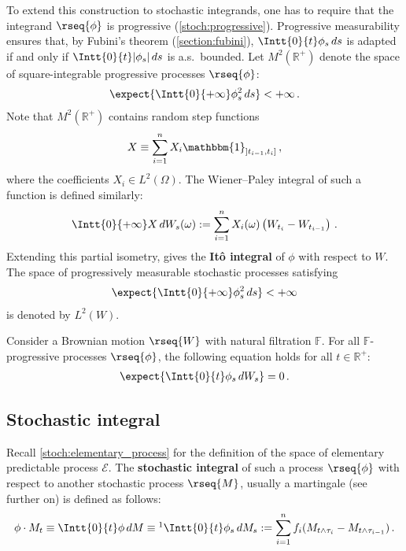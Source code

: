     To extend this construction to stochastic integrands, one has to require that the integrand $\rseq{\phi}$ is progressive (\cref{stoch:progressive}). Progressive measurability ensures that, by Fubini's theorem (\cref{section:fubini}), $\Intt{0}{t}\phi_s\,ds$ is adapted if and only if $\Intt{0}{t}|\phi_s|\,ds$ is a.s.~bounded. Let $M^2(\mathbb{R}^+)$ denote the space of square-integrable progressive processes $\rseq{\phi}$:
    \begin{gather}
        \expect{\Intt{0}{+\infty}\phi^2_s\,ds}<+\infty\,.
    \end{gather}
    Note that $M^2(\mathbb{R}^+)$ contains random step functions
    \begin{gather}
        X\equiv\sum_{i=1}^nX_i\mathbbm{1}_{]t_{i-1},t_i]}\,,
    \end{gather}
    where the coefficients $X_i\in L^2(\Omega)$. The Wiener--Paley integral of such a function is defined similarly:
    \begin{gather}
        \label{stoch:random_elementary_wiener_integral}
        \Intt{0}{+\infty}X\,dW_s(\omega) := \sum_{i=1}^nX_i(\omega)\left(W_{t_i} - W_{t_{i-1}}\right)\,.
    \end{gather}
    Extending this partial isometry, gives the \textbf{It\^o integral} of $\phi$ with respect to $W$. The space of progressively measurable stochastic processes satisfying
    \begin{gather}
        \expect{\Intt{0}{+\infty}\phi_s^2\,ds}<+\infty
    \end{gather}
    is denoted by $L^2(W)$.

    \begin{property}[Centrality]\label{stoch:wiener_integral_central}
        Consider a Brownian motion $\rseq{W}$ with natural filtration $\mathbb{F}$. For all $\mathbb{F}$-progressive processes $\rseq{\phi}$, the following equation holds for all $t\in\mathbb{R}^+$:
        \begin{gather}
            \expect{\Intt{0}{t}\phi_s\,dW_s} = 0\,.
        \end{gather}
    \end{property}

\subsection{Stochastic integral}

    Recall \cref{stoch:elementary_process} for the definition of the space of elementary predictable process $\mathcal{E}$. The \textbf{stochastic integral} of such a process $\rseq{\phi}$ with respect to another stochastic process $\rseq{M}$, usually a martingale (see further on) is defined as follows:
    \begin{gather}
        \label{stoch:elementary_integral}
        \phi\cdot M_t \equiv \Intt{0}{t}\phi\,dM \equiv\footnotemark \Intt{0}{t}\phi_s\,dM_s := \sum_{i=1}^nf_i(M_{t\land\tau_i} - M_{t\land\tau_{i-1}})\,.
    \end{gather}

